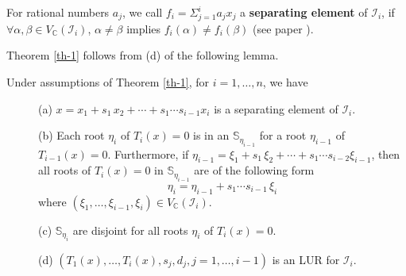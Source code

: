 \documentclass[amsthm]{JSC_LaTex_2007_Mar_12/elsart}
\def\C{{\mathbb{C}}}
\def\IS{{\mathcal{I}}}
\begin{document}
For rational numbers $a_j$, we call $f_i=\Sigma_{j=1}^i a_j x_j$ a
{\bf separating element} of $\IS_i$, if $\forall \alpha,\beta\in
V_{\mathbb{C}}(\IS_i)$,  $\alpha\ne\beta$ implies $f_i(\alpha)\neq
f_i(\beta)$ (see paper \cite{rur}).

Theorem \ref{th-1} follows from (d) of the following lemma.
\begin{lem}\label{lm-ww1}
Under assumptions of Theorem \ref{th-1}, for $i=1,\ldots,n$, we have
\begin{description}
\item[] (a) $x=x_1+s_1\,x_2+\cdots+s_1\cdots s_{i-1}x_i$ is a separating element of
$\IS_i$.

\item[] (b) Each root $\eta_{i}$ of $T_{i}(x)=0$ is in an $\mathbb{S}_{\eta_{i-1}}$
for a root $\eta_{i-1}$ of $T_{i-1}(x)=0$. Furthermore, if
$\eta_{i-1}=\xi_1+s_1\,\xi_2+\cdots+s_1\cdots s_{i-2}\xi_{i-1}$,
then all roots of $T_{i}(x)=0$ in $\mathbb{S}_{\eta_{i-1}}$ are of
the following form
\begin{equation}\label{eq-ww2} \eta_{i}=\eta_{i-1} +s_1\cdots
 s_{i-1}\,\xi_{i}\end{equation}
where $(\xi_1,\ldots,\xi_{i-1},\xi_{i})\in V_{\C}(\IS_{i})$.

\item[] (c) $\mathbb{S}_{\eta_{i}}$ are disjoint for all roots $\eta_i$ of
$T_i(x)=0$.

\item[] (d) $(T_1(x),\ldots,T_i(x), s_j, d_j, j=1,\dots,i-1)$ is an LUR for $\IS_i$.
\end{description}
\end{lem}
\end{document}
